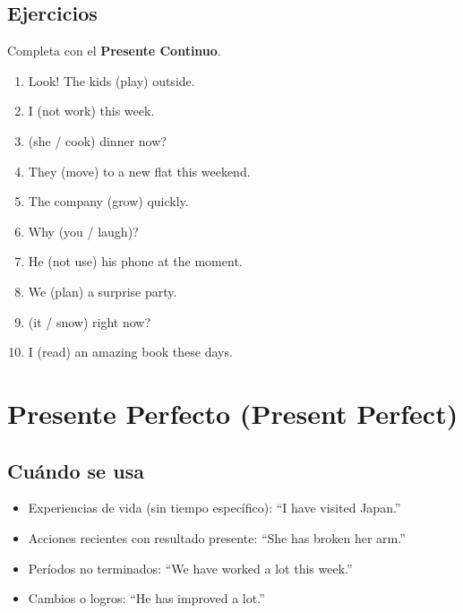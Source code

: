 \documentclass[11pt,a4paper]{article}
\begin{document}
\subsection*{Ejercicios}
Completa con el \textbf{Presente Continuo}.
\begin{enumerate}
  \item Look! The kids \underline{\hspace{2.5cm}} (play) outside.
  \item I \underline{\hspace{2.5cm}} (not work) this week.
  \item \underline{\hspace{2.5cm}} (she / cook) dinner now?
  \item They \underline{\hspace{2.5cm}} (move) to a new flat this weekend.
  \item The company \underline{\hspace{2.5cm}} (grow) quickly.
  \item Why \underline{\hspace{2.5cm}} (you / laugh)?
  \item He \underline{\hspace{2.5cm}} (not use) his phone at the moment.
  \item We \underline{\hspace{2.5cm}} (plan) a surprise party.
  \item \underline{\hspace{2.5cm}} (it / snow) right now?
  \item I \underline{\hspace{2.5cm}} (read) an amazing book these days.
\end{enumerate}

\section{Presente Perfecto (Present Perfect)}
\subsection*{Cuándo se usa}
\begin{itemize}
  \item Experiencias de vida (sin tiempo específico): ``I have visited Japan.''
  \item Acciones recientes con resultado presente: ``She has broken her arm.''
  \item Períodos no terminados: ``We have worked a lot this week.''
  \item Cambios o logros: ``He has improved a lot.''
\end{itemize}
\end{document}
